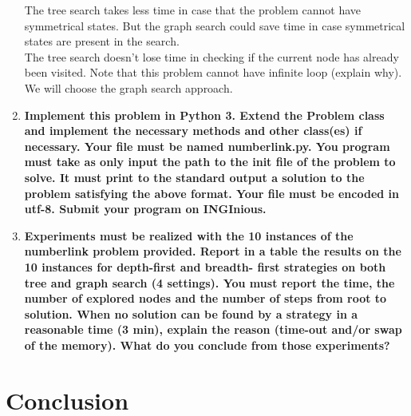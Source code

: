 \documentclass[10pt,a4paper]{article}
\begin{document}
\begin{enumerate}
	The tree search takes less time in case that the problem cannot have symmetrical states. But the graph search could save time in case symmetrical states are present in the search. \\
	
	The tree search doesn't lose time in checking if the current node has already been visited. Note that this problem cannot have infinite loop (explain why). \\
	
	We will choose the graph search approach. 
	
	\item \textbf{Implement this problem in Python 3. Extend the Problem class and implement the necessary methods and other class(es) if necessary. Your file must be named numberlink.py. You program must take as only input the path to the init file of the problem to solve. It must print to the standard output a solution to the problem satisfying the above format. Your file must be encoded in utf-8. Submit your program on INGInious.} \\
	
	\item \textbf{Experiments must be realized with the 10 instances of the numberlink problem provided. Report in a table the results on the 10 instances for depth-first and breadth- first strategies on both tree and graph search (4 settings). You must report the time, the number of explored nodes and the number of steps from root to solution. When no solution can be found by a strategy in a reasonable time (3 min), explain the reason (time-out and/or swap of the memory). What do you conclude from those experiments?} \\
	

\end{enumerate}

\section*{Conclusion}
\end{document}

